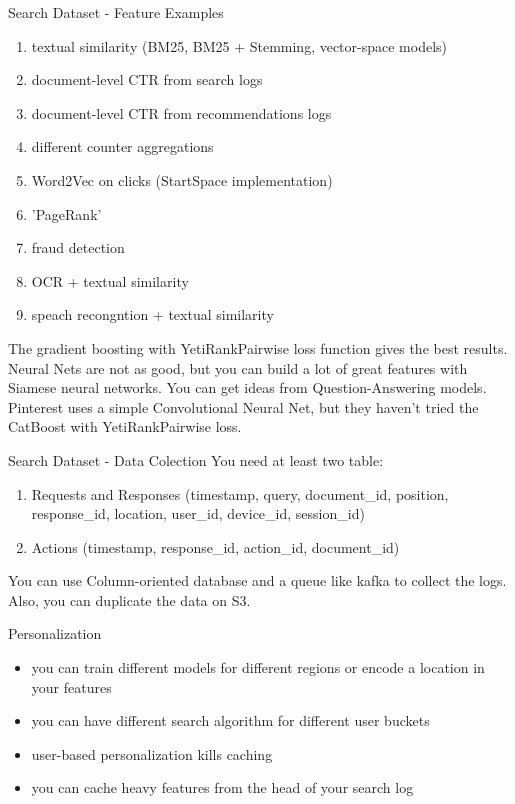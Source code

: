 \documentclass[10pt]{beamer}
\begin{document}
\begin{frame}{Search Dataset - Feature Examples}
    \begin{enumerate}
        \item textual similarity (BM25, BM25 + Stemming, vector-space models)
        \item document-level CTR from search logs
        \item document-level CTR from recommendations logs
        \item different counter aggregations
        \item Word2Vec on clicks (StartSpace implementation)
        \item 'PageRank'
        \item fraud detection
        \item OCR + textual similarity
        \item speach recongntion + textual similarity
    \end{enumerate}
    The gradient boosting with YetiRankPairwise loss function gives the best results. Neural Nets are not as good, but you can build a lot of great features with Siamese neural networks. You can get ideas from Question-Answering models. Pinterest uses a simple Convolutional Neural Net, but they haven't tried the CatBoost with YetiRankPairwise loss.
\end{frame}

\begin{frame}{Search Dataset - Data Colection}
You need at least two table:
    \begin{enumerate}
        \item Requests and Responses (timestamp, query, document\_id, position, response\_id, location, user\_id, device\_id, session\_id)
        \item Actions (timestamp, response\_id, action\_id, document\_id)
    \end{enumerate}
You can use Column-oriented database and a queue like kafka to collect the logs. Also, you can duplicate the data on S3.
\end{frame}


\begin{frame}{Personalization}
    \begin{itemize}
        \item you can train different models for different regions or encode a location in your features
        \item you can have different search algorithm for different user buckets
        \item user-based personalization kills caching 
        \item you can cache heavy features from the head of your search log
    \end{itemize}
\end{frame}
\end{document}
